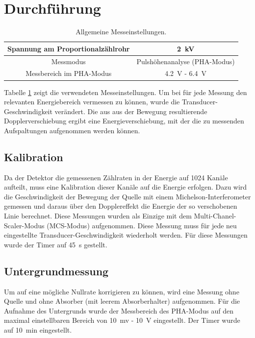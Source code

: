 \documentclass[12pt,a4paper]{article}
\begin{document}
\section{Durchführung}

\begin{table}
\centering
\begin{tabular}{|c|c|}
\hline 
Spannung am Proportionalzählrohr & \SI{2}{kV} \\ 
\hline 
Messmodus & Pulshöhenanalyse (PHA-Modus) \\
\hline 
Messbereich im PHA-Modus & \SI{4,2}{V} - \SI{6,4}{V} \\
\hline 
\end{tabular} 
\caption{Allgemeine Messeinstellungen.}
\label{tab:Mess_Einstellungen}
\end{table}

Tabelle \ref{tab:Mess_Einstellungen} zeigt die verwendeten Messeinstellungen. Um bei für jede Messung den relevanten Energiebereich vermessen zu können, wurde die Transducer-Geschwindigkeit verändert. Die aus aus der Bewegung resultierende Dopplerverschiebung  ergibt eine Energieverschiebung, mit der die zu messenden Aufspaltungen aufgenommen werden können.

\subsection{Kalibration}
Da der Detektor die gemessenen Zählraten in der Energie auf 1024 Kanäle aufteilt, muss eine Kalibration dieser Kanäle auf die Energie erfolgen. Dazu wird die Geschwindigkeit der Bewegung der Quelle mit einem Michelson-Interferometer gemessen und daraus über den Dopplereffekt die Energie der so verschobenen Linie berechnet. Diese Messungen wurden als Einzige mit dem Multi-Chanel-Scaler-Modus (MCS-Modus) aufgenommen. Diese Messung muss für jede neu eingestellte Transducer-Geschwindigkeit wiederholt werden. Für diese Messungen wurde der Timer auf \SI{45}{s} gestellt.

\subsection{Untergrundmessung}
Um auf eine mögliche Nullrate korrigieren zu können, wird eine Messung ohne Quelle und ohne Absorber (mit leerem Absorberhalter) aufgenommen. Für die Aufnahme des Untergrunds wurde der Messbereich des PHA-Modus auf den maximal einstellbaren Bereich von \SI{10}{mv} - \SI{10}{V} eingestellt. Der Timer wurde auf \SI{10}{min} eingestellt.
\end{document}
